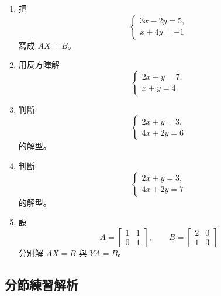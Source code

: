 \documentclass[11pt,a4paper]{article}
\begin{document}
\begin{enumerate}
\def\labelenumi{\arabic{enumi}.}
\item
  把
  \[\begin{cases}3x-2y=5,\\x+4y=-1\end{cases}\]
  寫成 \(AX=B\)。
\item
  用反方陣解
  \[\begin{cases}2x+y=7,\\x+y=4\end{cases}\]
\item
  判斷
  \[\begin{cases}2x+y=3,\\4x+2y=6\end{cases}\]
  的解型。
\item
  判斷
  \[\begin{cases}2x+y=3,\\4x+2y=7\end{cases}\]
  的解型。
\item
  設
  \[A=\begin{bmatrix}1&1\\0&1\end{bmatrix},\qquad
  B=\begin{bmatrix}2&0\\1&3\end{bmatrix}\]
  分別解 \(AX=B\) 與 \(YA=B\)。
\end{enumerate}

\subsection{分節練習解析}\label{ux5206ux7bc0ux7df4ux7fd2ux89e3ux6790-5}
\end{document}
